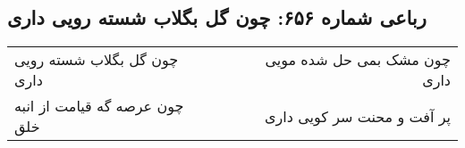 \begin{center}
\section*{رباعی شماره ۶۵۶: چون گل بگلاب شسته رویی داری}
\label{sec:sh656}
\begin{longtable}{l p{0.5cm} r}
چون گل بگلاب شسته رویی داری
&&
چون مشک بمی حل شده مویی داری
\\
چون عرصه گه قیامت از انبه خلق
&&
پر آفت و محنت سر کویی داری
\\
\end{longtable}
\end{center}
